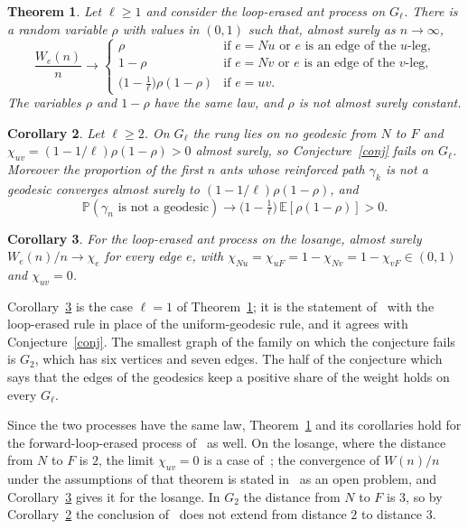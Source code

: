 \documentclass[11pt]{amsart}
\newtheorem{theorem}{Theorem}
\newtheorem{corollary}[theorem]{Corollary}
\theoremstyle{remark}
\newcommand{\PP}{\mathbb{P}}
\newcommand{\EE}{\mathbb{E}}
\begin{document}
\begin{theorem}\label{thm:main}
Let $\ell\ge1$ and consider the loop-erased ant process on $G_\ell$. There is a random variable $\rho$ with values in
$(0,1)$ such that, almost surely as $n\to\infty$,
\[
\frac{W_e(n)}{n}\to
\begin{cases}
\rho & \text{if $e=Nu$ or $e$ is an edge of the $u$-leg,}\\
1-\rho & \text{if $e=Nv$ or $e$ is an edge of the $v$-leg,}\\
\bigl(1-\tfrac1\ell\bigr)\rho(1-\rho) & \text{if $e=uv$.}
\end{cases}
\]
The variables $\rho$ and $1-\rho$ have the same law, and $\rho$ is not almost surely constant.
\end{theorem}

\begin{corollary}\label{cor:fail}
Let $\ell\ge2$. On $G_\ell$ the rung lies on no geodesic from $N$ to $F$ and $\chi_{uv}=(1-1/\ell)\rho(1-\rho)>0$
almost surely, so Conjecture~\ref{conj} fails on $G_\ell$. Moreover the proportion of the first $n$ ants whose
reinforced path $\gamma_k$ is not a geodesic converges almost surely to $(1-1/\ell)\rho(1-\rho)$, and
\[
\PP(\gamma_n\text{ is not a geodesic})\to\bigl(1-\tfrac1\ell\bigr)\,\EE[\rho(1-\rho)]>0 .
\]
\end{corollary}

\begin{corollary}\label{cor:losange}
For the loop-erased ant process on the losange, almost surely $W_e(n)/n\to\chi_e$ for every edge $e$, with
$\chi_{Nu}=\chi_{uF}=1-\chi_{Nv}=1-\chi_{vF}\in(0,1)$ and $\chi_{uv}=0$.
\end{corollary}

Corollary~\ref{cor:losange} is the case $\ell=1$ of Theorem~\ref{thm:main}; it is the statement
of~\cite[Theorem~1.4]{KMS} with the loop-erased rule in place of the uniform-geodesic rule, and it agrees with
Conjecture~\ref{conj}. The smallest graph of the family on which the conjecture fails is $G_2$, which has six vertices
and seven edges. The half of the conjecture which says that the edges of the geodesics keep a positive share of the
weight holds on every $G_\ell$.

Since the two processes have the same law, Theorem~\ref{thm:main} and its corollaries hold for the
forward-loop-erased process of~\cite{AM} as well. On the losange, where the distance from $N$ to $F$ is $2$, the limit $\chi_{uv}=0$ is a case
of~\cite[Theorem~1.1]{AM}; the convergence of $W(n)/n$ under the assumptions of that theorem is stated in~\cite{AM} as
an open problem, and Corollary~\ref{cor:losange} gives it for the losange. In $G_2$ the distance from $N$ to $F$ is
$3$, so by Corollary~\ref{cor:fail} the conclusion of~\cite[Theorem~1.1]{AM} does not extend from distance $2$ to
distance $3$.
\end{document}
